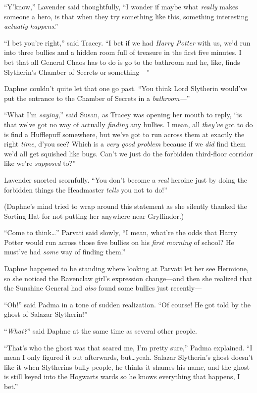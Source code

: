 “Y’know,” Lavender said thoughtfully, “I wonder if maybe what \emph{really} makes someone a hero, is that when they try something like this, something interesting \emph{actually happens}.”

“I bet you’re right,” said Tracey. “I bet if we had \emph{Harry Potter} with us, we’d run into three bullies and a hidden room full of treasure in the first five minutes. I bet that all General Chaos has to do is go to the bathroom and he, like, finds Slytherin’s Chamber of Secrets or something—”

Daphne couldn’t quite let that one go past. “You think Lord Slytherin would’ve put the entrance to the Chamber of Secrets in a \emph{bathroom—}”

“What I’m \emph{saying},” said Susan, as Tracey was opening her mouth to reply, “is that we’ve got no way of actually \emph{finding} any bullies. I mean, all \emph{they’ve} got to do is find a Hufflepuff somewhere, but we’ve got to run across them at exactly the right \emph{time}, d’you see? Which is a \emph{very good problem} because if we \emph{did} find them we’d all get squished like bugs. Can’t we just do the forbidden third-floor corridor like we’re \emph{supposed} to?”

Lavender snorted scornfully. “You don’t become a \emph{real} heroine just by doing the forbidden things the Headmaster \emph{tells} you not to do!”

(Daphne’s mind tried to wrap around this statement as she silently thanked the Sorting Hat for not putting her anywhere near Gryffindor.)

“Come to think…” Parvati said slowly, “I mean, what’re the odds that Harry Potter would run across those five bullies on his \emph{first morning} of school? He must’ve had \emph{some} way of finding them.”

Daphne happened to be standing where looking at Parvati let her see Hermione, so she noticed the Ravenclaw girl’s expression change—and then she realized that the Sunshine General had \emph{also} found some bullies just recently—

“Oh!” said Padma in a tone of sudden realization. “Of course! He got told by the ghost of Salazar Slytherin!”

“\emph{What?}” said Daphne at the same time as several other people.

“That’s who the ghost was that scared me, I’m pretty sure,” Padma explained. “I mean I only figured it out afterwards, but…yeah. Salazar Slytherin’s ghost doesn’t like it when Slytherins bully people, he thinks it shames his name, and the ghost is still keyed into the Hogwarts wards so he knows everything that happens, I bet.”

